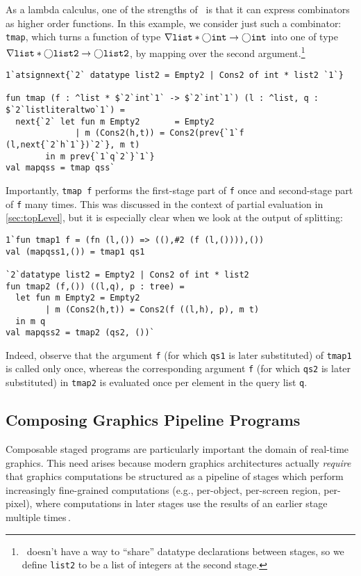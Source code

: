 As a lambda calculus, one of the strengths of \lang\ is that it
can express combinators as higher order functions.
In this example, we consider just such a combinator: \texttt{tmap},
which turns a function of type
$\nabla \mathtt{list} * \bigcirc \mathtt{int} \to \bigcirc \mathtt{int}$
into one of type
$\nabla \mathtt{list} * \bigcirc \mathtt{list2} \to \bigcirc \mathtt{list2}$,
by mapping over the second argument.\footnote{
\lang\ doesn't have a way to ``share'' datatype declarations between stages, 
so we define \texttt{list2} to be a list of integers at the second stage.}
\begin{lstlisting} 
1`atsignnext{`2` datatype list2 = Empty2 | Cons2 of int * list2 `1`}

fun tmap (f : ^list * $`2`int`1` -> $`2`int`1`) (l : ^list, q : $`2`listliteraltwo`1`) = 
  next{`2` let fun m Empty2       = Empty2
              | m (Cons2(h,t)) = Cons2(prev{`1`f (l,next{`2`h`1`})`2`}, m t)
        in m prev{`1`q`2`}`1`}
val mapqss = tmap qss`
\end{lstlisting}
Importantly, \texttt{tmap f} performs the first-stage part of \texttt{f} once
and second-stage part of \texttt{f} many times.
This was discussed in the context of partial evaluation in \ref{sec:topLevel}, 
but it is especially clear when we look at the output of splitting:
\begin{lstlisting} 
1`fun tmap1 f = (fn (l,()) => ((),#2 (f (l,()))),())
val (mapqss1,()) = tmap1 qs1

`2`datatype list2 = Empty2 | Cons2 of int * list2
fun tmap2 (f,()) ((l,q), p : tree) =
  let fun m Empty2 = Empty2
        | m (Cons2(h,t)) = Cons2(f ((l,h), p), m t) 
  in m q
val mapqss2 = tmap2 (qs2, ())`
\end{lstlisting}
%
Indeed, observe that the argument \texttt{f} (for which \texttt{qs1} is later substituted) of \texttt{tmap1} is called only once,
whereas the corresponding argument \texttt{f} (for which \texttt{qs2} is later substituted) in \texttt{tmap2} is evaluated once 
per element in the query list \texttt{q}.

\subsection{Composing Graphics Pipeline Programs}
\label{sec:graphics}

Composable staged programs are particularly important the domain of real-time graphics.
This need arises because modern graphics architectures actually
\emph{require} that graphics computations be structured as a pipeline
of stages which perform increasingly fine-grained computations (e.g.,
per-object, per-screen region, per-pixel), where computations in later
stages use the results of an earlier
stage multiple times\,\cite{OpenGL4Spec}.


